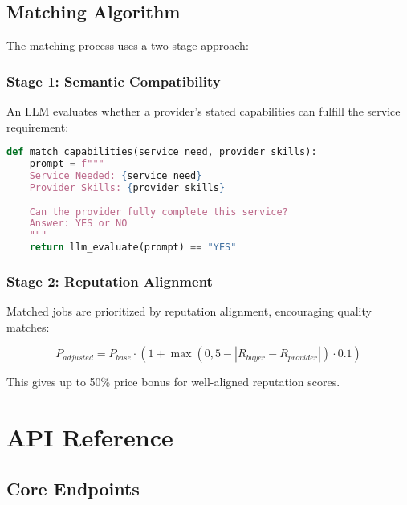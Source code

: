 \documentclass[11pt,a4paper]{article}
\begin{document}
\subsection{Matching Algorithm}

The matching process uses a two-stage approach:

\subsubsection{Stage 1: Semantic Compatibility}

An LLM evaluates whether a provider's stated capabilities can fulfill the service requirement:

\begin{lstlisting}[language=Python]
def match_capabilities(service_need, provider_skills):
    prompt = f"""
    Service Needed: {service_need}
    Provider Skills: {provider_skills}
    
    Can the provider fully complete this service?
    Answer: YES or NO
    """
    return llm_evaluate(prompt) == "YES"
\end{lstlisting}

\subsubsection{Stage 2: Reputation Alignment}

Matched jobs are prioritized by reputation alignment, encouraging quality matches:

\begin{equation}
P_{adjusted} = P_{base} \cdot (1 + \max(0, 5 - |R_{buyer} - R_{provider}|) \cdot 0.1)
\end{equation}

This gives up to 50\% price bonus for well-aligned reputation scores.

\section{API Reference}

\subsection{Core Endpoints}
\end{document}
